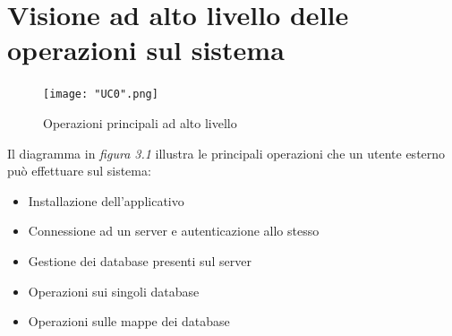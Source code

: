 \documentclass[a4paper]{report}
\begin{document}
		\section{Visione ad alto livello delle operazioni sul sistema}
		 	\begin{figure}[H]
				\centering
				\texttt{[image: "UC0".png]}
				\caption{Operazioni principali ad alto livello}
			\end{figure}
			Il diagramma in \emph{figura 3.1} illustra le principali operazioni che un utente esterno può
			 effettuare sul sistema:
			\begin{itemize}
				\item Installazione dell'applicativo
				\item Connessione ad un server e autenticazione allo stesso
				\item Gestione dei database presenti sul server
				\item Operazioni sui singoli database
				\item Operazioni sulle mappe dei database
			\end{itemize}
\end{document}

